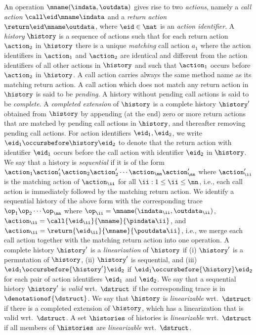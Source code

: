 An operation $\mname(\indata,\outdata)$ gives rise to two {\it actions}, namely
a {\it call action} $\call\eid\mname\indata$ and 
a {\it return action} $\return\eid\mname\outdata$, where $\eid\in\nat$ is an
{\it action identifier}.
%
A {\it history} $\history$ is a sequence of actions such that
for each return action $\action_2$ in $\history$ there is a unique
{\it matching}  call action $a_1$ where the action identifiers
in $\action_1$ and $\action_2$ are identical and different from the action
identifiers of all other actions in $\history$ and such that
$\action_1$ occurs before $\action_2$ in $\history$.
%
A call action carries always the same method name as its matching return
action.
A call action which does not match any return action in $\history$ is said
to be {\em pending}.
A history without pending call actions is said to be {\em complete}.
A {\em completed extension} of $\history$ is a complete history
$\history'$ obtained from $\history$ by
  appending (at the end) zero or more return actions that are matched by
  pending call actions in $\history$, and
  thereafter removing pending call actions.
%
For action identifiers $\eid_1,\eid_2$, we write
$\eid_1\occursbefore\history\eid_2$ to denote that
the return action with identifier $\eid_1$ occurs before
the call action with identifier $\eid_2$ in $\history$.
We say that a history is {\it sequential} if
it is of the form
$\action_1\action'_1\action_2\action'_2\cdots\action_\nn\action'_\nn$
where $\action'_\ii$ is the matching action of $\action_\ii$ 
for all $\ii:1\leq\ii\leq\nn$, i.e., each call action 
is immediately followed by the matching return action. 
%
We identify a sequential history of the above form with
the corresponding trace 
$\op_1\op_2\cdots\op_\nn$ where
$\op_\ii=\mname(\indata_\ii,\outdata_\ii)$,
$\action_\ii=\call{\eid_\ii}{\mname}{\pindata\ii}$, and
$\action_\ii=\return{\eid_\ii}{\mname}{\poutdata\ii}$,
i.e., we merge each call action together with the matching return action
into one operation.
%
A complete history $\history'$ 
is a {\it linearization} of $\history$ if
(i) $\history'$ is a permutation of $\history$,
(ii) $\history'$ is sequential, 
and
(iii) $\eid_1\occursbefore{\history'}\eid_2$
if $\eid_1\occursbefore{\history}\eid_2$
for each pair of action identifiers $\eid_1$ and $\eid_2$.
%
We say that a sequential history $\history'$ is {\it valid} wrt.\ $\dstruct$ if
the corresponding trace is in $\denotationof{\dstruct}$.
%
We say that $\history$ is {\it linearizable} wrt.\ $\dstruct$ if there is
a completed extension of $\history$, which has
a linearization that is valid wrt.\ $\dstruct$.
%
A set $\histories$ of histories is {\it linearizable} wrt.\ $\dstruct$ if 
all members of $\histories$ are  {\it linearizable} wrt.\ $\dstruct$.


